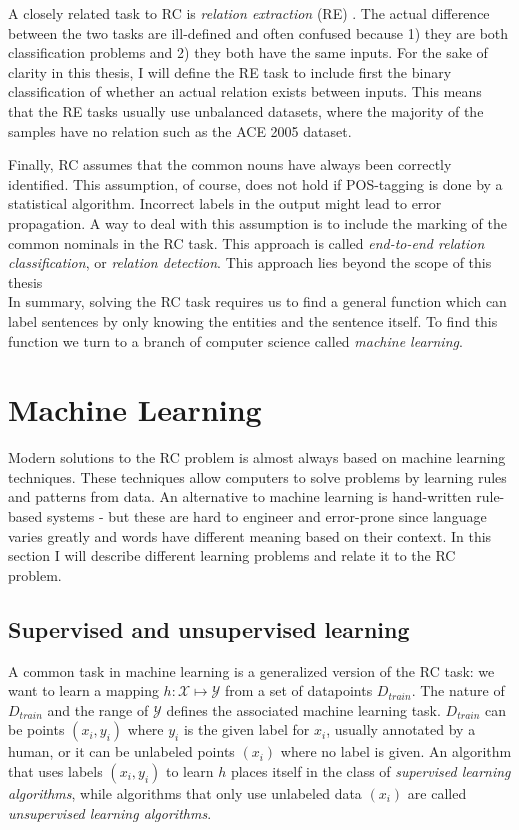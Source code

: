 A closely related task to RC is \emph{relation extraction} (RE) . The actual difference between the two tasks are ill-defined and often confused because 1) they are both classification problems and 2) they both have the same inputs. For the sake of clarity in this thesis, I will define the RE task to include first the binary classification of whether an actual relation exists between inputs. This means that the RE tasks usually use unbalanced datasets, where the majority of the samples have no relation such as the ACE 2005 dataset\cite{ace2005}. 

Finally, RC assumes that the common nouns have always been correctly identified. This assumption, of course, does not hold if POS-tagging is done by a statistical algorithm. Incorrect labels in the output might lead to error propagation.
A way to deal with this assumption is to include the marking of the common nominals in the RC task. This approach is called \emph{end-to-end relation classification}, or \emph{relation detection}. This approach lies beyond the scope of this thesis\\





In summary, solving the RC task requires us to find a general function which can label sentences by only knowing the entities and the sentence itself. To find this function we turn to a branch of computer science called \emph{machine learning}.



\section{Machine Learning}

Modern solutions to the RC problem is almost always based on machine learning techniques. These techniques allow computers to solve problems by learning rules and patterns from data. An alternative to machine learning is hand-written rule-based systems - but these are hard to engineer and error-prone since language varies greatly and words have different meaning based on their context. In this section I will describe different learning problems and relate it to the RC problem.  


\subsection{Supervised and unsupervised learning}
A common task in machine learning is a generalized version of the RC task: we want to learn a mapping $h : \mathcal{X} \mapsto \mathcal{Y}$ from a set of datapoints $D_{train}$. The nature of $D_{train}$ and the range of $\mathcal{Y}$ defines the associated machine learning task\cite{semisupervised_book}. $D_{train}$ can be points $(x_i, y_i)$ where $y_i$ is the given label for $x_i$, usually annotated by a human, or it can be unlabeled points $(x_i)$ where no label is given. An algorithm that uses labels $(x_i, y_i)$ to learn $h$ places itself in the class of \emph{supervised learning algorithms}, while algorithms that only use unlabeled data $(x_i)$ are called \emph{unsupervised learning algorithms}. 

